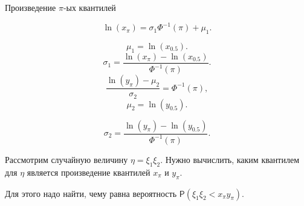 \documentclass[ucs, notheorems, handout]{beamer}
\begin{document}
	\begin{frame}{Произведение $\pi$-ых квантилей}
		
		\begin{equation*}
			\ln(x_{\pi})=\sigma_{1}\Phi^{-1}(\pi)+\mu_{1}.\label{12}
		\end{equation*}

		\begin{equation*}
			\mu_{1}=\ln(x_{0.5}).\label{13}
		\end{equation*}
		\begin{equation*}
			\sigma_{1}=\frac{\ln(x_{\pi})-\ln(x_{0.5})}{\Phi^{-1}(\pi)}.\label{14}
		\end{equation*}
		\begin{equation*}
			\frac{\ln(y_{\pi})-\mu_{2}}{\sigma_{2}}=\Phi^{-1}(\pi),\label{15}
		\end{equation*}
		\begin{equation*}
			\mu_{2}=\ln(y_{0.5}).\label{16}
		\end{equation*}

		\begin{equation*}
			\displaystyle{\sigma_{2}=\frac{\ln(y_{\pi})-\ln(y_{0.5})}{\Phi^{-1}(\pi)}.\label{17}}
		\end{equation*}
		
		Рассмотрим случайную величину $\eta = \xi_{1}\xi_{2}$. Нужно вычислить, каким квантилем для $\eta$ является произведение квантилей $x_{\pi}$ и $y_{\pi}$. 
		
		Для этого надо найти, чему равна вероятность $\mathsf{P}(\xi_{1}\xi_{2}< x_{\pi}y_{\pi})$.
		
	\end{frame}
	
\end{document}
